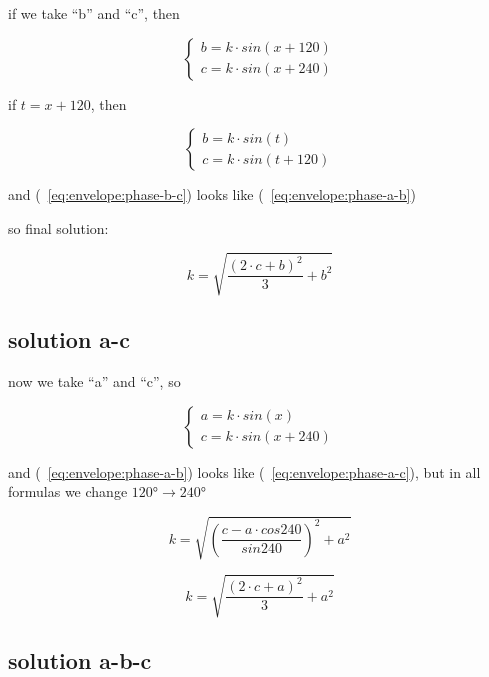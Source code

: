 \documentclass[unicode, 12pt, a4paper]{article}
\begin{document}
if we take ``b'' and ``c'', then

\begin{equation}
  \begin{cases}
    b = k \cdot sin(x + 120)\\
    c = k \cdot sin(x + 240)
  \end{cases}
\end{equation}

if $t = x + 120$, then

\begin{equation}
  \label{eq:envelope:phase-b-c}
  \begin{cases}
    b = k \cdot sin(t)\\
    c = k \cdot sin(t + 120)
  \end{cases}
\end{equation}

and (~\ref{eq:envelope:phase-b-c}) looks like (~\ref{eq:envelope:phase-a-b})

so final solution:

\begin{equation}
  k = \sqrt{\frac{(2 \cdot c + b)^2}{3} + b^2}
\end{equation}


\subsection{solution a-c}

now we take ``a'' and ``c'', so

\begin{equation}
  \label{eq:envelope:phase-a-c}
  \begin{cases}
    a = k \cdot sin(x)\\
    c = k \cdot sin(x + 240)
  \end{cases}
\end{equation}

and (~\ref{eq:envelope:phase-a-b}) looks like (~\ref{eq:envelope:phase-a-c}), but in all formulas we change $120° \rightarrow 240°$

\begin{equation}
  k = \sqrt{\left(\frac{c - a \cdot cos 240}{sin 240}\right)^2 + a^2}
\end{equation}

\begin{equation}
  k = \sqrt{\frac{(2 \cdot c + a)^2}{3} + a^2}
\end{equation}

\subsection{solution a-b-c}
\end{document}
